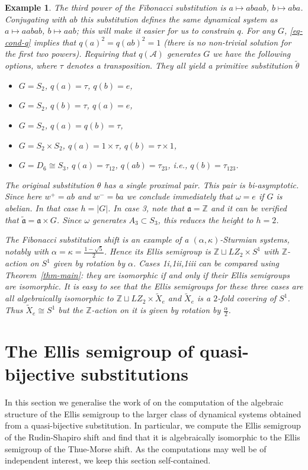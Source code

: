 \documentclass[10pt,a4paper]{amsart}
\newtheorem{example}[theorem]{Example}
\numberwithin{equation}{section}
\newcommand{\Z}{\mathbb Z}
\newcommand{\Aa}{{\mathcal A}}
\newcommand{\aut}{{\mathfrak a}}
\newcommand{\al}{\alpha}
\newcommand{\cut}{\kappa}
\begin{document}
\begin{example}
The third power of the Fibonacci substitution is $a\mapsto abaab$, $b\mapsto aba$. Conjugating with $ab$ this substitution defines the same dynamical system as $a\mapsto aabab$, $b\mapsto aab$; this will make it easier for us to constrain $q$.
For any $G$, \eqref{eq-cond-q} implies that $q(a)^2=q(ab)^2 = 1$ (there is no non-trivial solution for the first two powers). 
Requiring that $q(\Aa)$ generates $G$ we have the following options, where $\tau$ denotes a transposition. They  all yield a primitive substitution $\tilde\theta$
\begin{itemize}
\item[1i] $G=S_2$, $q(a) = \tau$, $q(b)=e$,
\item[1ii] $G=S_2$, $q(b) = \tau$, $q(a)=e$,
\item[1iii] $G=S_2$, $q(a)=q(b) = \tau$,
\item[2] $G=S_2\times S_2$,  $q(a) = 1\times \tau$, $q(b)=\tau\times 1$,
\item[3] $G=D_6\cong S_3$, $q(a) = \tau_{12}$, $q(ab)=\tau_{23}$, i.e., $q(b)=\tau_{123}$.
\end{itemize}
The original substitution $\theta$ has a single proximal pair. This pair  is bi-asymptotic. Since here $w^+=ab$ and $w^-=ba$ we conclude immediately that $\omega=e$ if $G$ is abelian. In that case $h=|G|$.  In case 3, note that $\aut = \mathbb Z$ and it can be verified that $\tilde\aut = \aut\times G$. Since $\omega$ generates $A_3\subset S_3$, this reduces the height to  $h=2$.

The Fibonacci substitution shift  is an  example of a $(\al,\cut)$-Sturmian systems, notably with $\al=\cut= {\frac{1-\sqrt{5}}2}$. Hence its Ellis semigroup is 
$\Z\sqcup LZ_2\times S^1$ with $\Z$-action on $S^1$ given by rotation by $\al$.
Cases 1i,1ii,1iii can be compared using Theorem~\ref{thm-main}: they are isomorphic if and only if their Ellis semigroups are isomorphic. It is easy to see that the Ellis semigroups for these three cases are all algebraically isomorphic to $\Z\sqcup LZ_2\times \tilde X_e$ and $ \tilde X_e$ is a $2$-fold covering of $S^1$. Thus $ \tilde X_e
\cong S^1$ but the $\Z$-action on it is given by rotation by $\frac{\al}2$.
\end{example}


\section{The Ellis semigroup of quasi-bijective substitutions}\label{ESQB}
In this section we generalise the work of \cite{ESBS} on the computation of the algebraic structure of the Ellis semigroup to the larger class of dynamical systems obtained from a quasi-bijective substitution. In particular, we compute the Ellis semigroup of the Rudin-Shapiro shift and find that it is algebraically isomorphic to the Ellis semigroup of the Thue-Morse shift. As the computations may well be of independent interest, we keep this section self-contained. 
\end{document}

